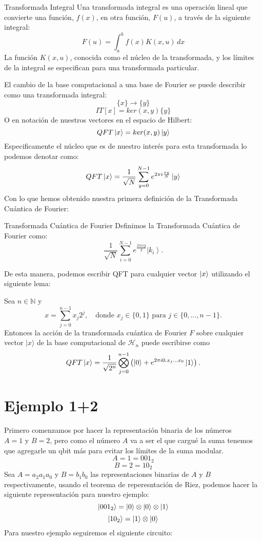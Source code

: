\documentclass{article}
\begin{document}
\begin{mydef}{Transformada Integral}{}
    Una transformada integral es una operación lineal que convierte una función, \(f(x)\), en otra función, \(F(u)\), a través de la siguiente integral:
\[ F(u) = \int_{a}^{b} f(x) K(x,u) \, dx \]
La función \(K(x,u)\), conocida como el núcleo de la transformada, y los límites de la integral se especifican para una transformada particular.
\end{mydef}
\noindent El cambio de la base computacional a una base de Fourier se puede describir
como una transformada integral:
\[\{x\}\to\{y\}\]
\[IT[x] = ker(x,y)\{y\}\]
O en notación de nuestros vectores en el espacio de Hilbert:
\[QFT\ket{x} = ker(x,y)\ket{y}\]
Especificamente el núcleo que es de nuestro interés para esta transformada lo podemos
denotar como:
\[QFT\ket{x}=\frac{1}{\sqrt{N}}\sum_{y=0}^{N-1}e^{2\pi i \frac{xy}{N}}\ket{y}\]
Con lo que hemos obtenido nuestra primera definición de la Transformada Cuántica de Fourier:
\begin{mydef}{Transformada Cuántica de Fourier}{}
    Definimos la Transformada Cuántica de Fourier como:
    \[\frac{1}{\sqrt{N}} \sum_{i=0}^{N-1} e^{\frac{2\pi i x y}{y}} \left| k_i \right\rangle.\]
\end{mydef}

De esta manera, podemos escribir QFT para cualquier vector \(\ket{x}\) utilizando el 
siguiente lema:
\begin{mylem}{}{}
    Sea $n \in \mathbb{N}$ y
    \[
    x =\sum_{j=0}^{n-1} x_j 2^j, \quad \text{donde } x_j \in \{0, 1\} \text{ para } j \in \{0, \ldots, n-1\}.
    \]
    Entonces la acción de la transformada cuántica de Fourier $F$ sobre cualquier vector $|x\rangle$ de la base computacional de $\mathcal{H}_n$ puede escribirse como
    \[
    QFT\ket{x} = \frac{1}{\sqrt{2^n}} \bigotimes_{j=0}^{n-1} \left( \ket{0} + e^{2\pi i 0.x_j \ldots x_0} \ket{1} \right).
    \]
\end{mylem}




\section{Ejemplo 1+2}
Primero comenzamos por hacer la representación binaria de los números
\(A = 1 \text{ y } B=2 \), pero como el número \(A\) va a ser el que cargué la suma
tenemos que agregarle un qbit más para evitar los límites de la suma modular.
\[A = 1 = 001_2\]
\[B=2=10_2\]
Sea \(A=a_{2}a_{1}a_{0}\) y \(B=b_1b_0\) las representaciones binarias de \(A \text{ y } B\)
respectivamente, usando el teorema de reperesntación de Riez, podemos hacer la siguiente representación
para nuestro ejemplo:
\[\ket{001_2}= \ket{0}\otimes\ket{0}\otimes\ket{1}\]
 \[\ket{10_2}=\ket{1}\otimes\ket{0}\]
Para nuestro ejemplo seguiremos el siguiente circuito:
\end{document}
